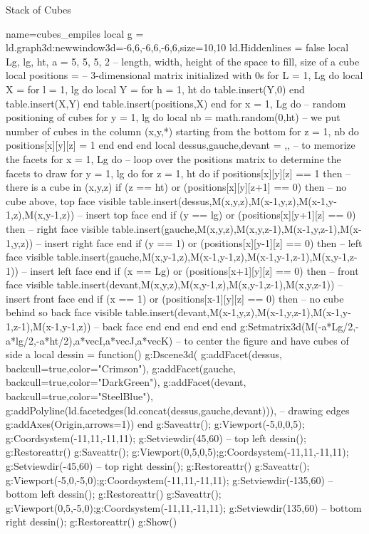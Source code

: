 \begin{demo}{Stack of Cubes}
\begin{luadraw}{name=cubes_empiles}
local g = ld.graph3d:new{window3d={-6,6,-6,6,-6,6},size={10,10}}
ld.Hiddenlines = false
local Lg, lg, ht, a = 5, 5, 5, 2 -- length, width, height of the space to fill, size of a cube
local positions = {} -- 3-dimensional matrix initialized with 0s
for L = 1, Lg do
    local X = {}
    for l = 1, lg do
        local Y = {}
        for h = 1, ht do table.insert(Y,0) end
        table.insert(X,Y)
    end
    table.insert(positions,X)
end
for x = 1, Lg do  -- random positioning of cubes
    for y = 1, lg do
        local nb = math.random(0,ht) -- we put number of cubes in the column (x,y,*) starting from the bottom
        for z = 1, nb do positions[x][y][z] = 1 end
    end
end
local dessus,gauche,devant = {},{},{} -- to memorize the facets
for x = 1, Lg do -- loop over the positions matrix to determine the facets to draw
    for y = 1, lg do
        for z = 1, ht do
            if positions[x][y][z] == 1 then -- there is a cube in  (x,y,z)
                if (z == ht) or (positions[x][y][z+1] == 0) then -- no cube above, top face visible
                    table.insert(dessus,{M(x,y,z),M(x-1,y,z),M(x-1,y-1,z),M(x,y-1,z)}) -- insert top face
                end
                if (y == lg) or (positions[x][y+1][z] == 0) then -- right face visible
                    table.insert(gauche,{M(x,y,z),M(x,y,z-1),M(x-1,y,z-1),M(x-1,y,z)}) -- insert right face
                end
                if (y == 1) or (positions[x][y-1][z] == 0) then -- left face visible
                    table.insert(gauche,{M(x,y-1,z),M(x-1,y-1,z),M(x-1,y-1,z-1),M(x,y-1,z-1)}) -- insert left face
                end                    
                if (x == Lg) or (positions[x+1][y][z] == 0) then -- front face visible
                    table.insert(devant,{M(x,y,z),M(x,y-1,z),M(x,y-1,z-1),M(x,y,z-1)}) -- insert front face
                end
                if (x == 1) or (positions[x-1][y][z] == 0) then -- no cube behind so back face visible
                    table.insert(devant,{M(x-1,y,z),M(x-1,y,z-1),M(x-1,y-1,z-1),M(x-1,y-1,z)}) -- back face
                end
            end
        end
    end
end
g:Setmatrix3d({M(-a*Lg/2,-a*lg/2,-a*ht/2),a*vecI,a*vecJ,a*vecK}) -- to center the figure and have cubes of side a
local dessin = function()
    g:Dscene3d(
        g:addFacet(dessus, {backcull=true,color="Crimson"}), g:addFacet(gauche, {backcull=true,color="DarkGreen"}),
        g:addFacet(devant, {backcull=true,color="SteelBlue"}),
        g:addPolyline(ld.facetedges(ld.concat(dessus,gauche,devant))), -- drawing edges
        g:addAxes(Origin,{arrows=1}))
end
g:Saveattr(); g:Viewport(-5,0,0,5); g:Coordsystem(-11,11,-11,11); g:Setviewdir(45,60) -- top left
 dessin(); g:Restoreattr()
g:Saveattr(); g:Viewport(0,5,0,5);g:Coordsystem(-11,11,-11,11); g:Setviewdir(-45,60) -- top right
dessin(); g:Restoreattr()
g:Saveattr(); g:Viewport(-5,0,-5,0);g:Coordsystem(-11,11,-11,11); g:Setviewdir(-135,60) -- bottom left
dessin(); g:Restoreattr()
g:Saveattr(); g:Viewport(0,5,-5,0);g:Coordsystem(-11,11,-11,11); g:Setviewdir(135,60) -- bottom right
dessin(); g:Restoreattr()
g:Show()
\end{luadraw}
\end{demo}


